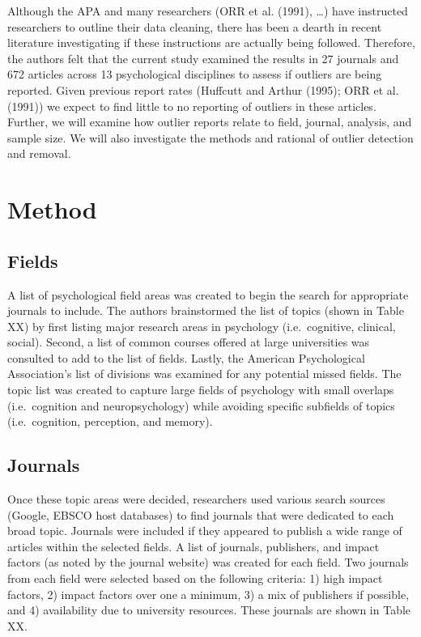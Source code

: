 \documentclass[english,man]{apa6}
\theoremstyle{definition}
\theoremstyle{definition}
\theoremstyle{definition}
\theoremstyle{remark}
\begin{document}
Although the APA and many researchers (ORR et al. (1991), \ldots{}) have
instructed researchers to outline their data cleaning, there has been a
dearth in recent literature investigating if these instructions are
actually being followed. Therefore, the authors felt that the current
study examined the results in 27 journals and 672 articles across 13
psychological disciplines to assess if outliers are being reported.
Given previous report rates (Huffcutt and Arthur (1995); ORR et al.
(1991)) we expect to find little to no reporting of outliers in these
articles. Further, we will examine how outlier reports relate to field,
journal, analysis, and sample size. We will also investigate the methods
and rational of outlier detection and removal.

\section{Method}\label{method}

\subsection{Fields}\label{fields}

A list of psychological field areas was created to begin the search for
appropriate journals to include. The authors brainstormed the list of
topics (shown in Table XX) by first listing major research areas in
psychology (i.e.~cognitive, clinical, social). Second, a list of common
courses offered at large universities was consulted to add to the list
of fields. Lastly, the American Psychological Association's list of
divisions was examined for any potential missed fields. The topic list
was created to capture large fields of psychology with small overlaps
(i.e.~cognition and neuropsychology) while avoiding specific subfields
of topics (i.e.~cognition, perception, and memory).

\subsection{Journals}\label{journals}

Once these topic areas were decided, researchers used various search
sources (Google, EBSCO host databases) to find journals that were
dedicated to each broad topic. Journals were included if they appeared
to publish a wide range of articles within the selected fields. A list
of journals, publishers, and impact factors (as noted by the journal
website) was created for each field. Two journals from each field were
selected based on the following criteria: 1) high impact factors, 2)
impact factors over one a minimum, 3) a mix of publishers if possible,
and 4) availability due to university resources. These journals are
shown in Table XX.
\end{document}
